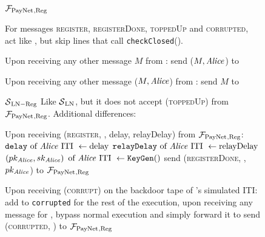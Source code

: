 \begin{figure}[!htbp]
  \begin{systembox}{$\mathcal{F}_{\mathrm{PayNet}}{}_{\mathrm{, Reg}}$}
    \begin{algorithmic}[1]
      \State For messages \textsc{register}, \textsc{registerDone},
      \textsc{toppedUp} and \textsc{corrupted}, act like \fpaynet{}, but skip
      lines that call \texttt{checkClosed}().
      \Statex

      \State Upon receiving any other message $M$ from \alice:
      \Indent
          \State send ($M, \mathit{Alice}$) to \simulator
        \EndIf
      \EndIndent
      \Statex

      \State Upon receiving any other message ($M, \mathit{Alice}$) from \simulator:
      \Indent
          \State send $M$ to \alice
        \EndIf
      \EndIndent
    \end{algorithmic}
  \end{systembox}
  \caption{}
  \label{alg:proof:fpaynet:reg}
\end{figure}

\begin{figure}[!htbp]
  \begin{simulatorbox}{$\mathcal{S}{}_{\mathrm{LN - Reg}}$}
    Like $\mathcal{S}{}_{\mathrm{LN}}$, but it does not accept
    (\textsc{toppedUp}) from $\mathcal{F}_{\mathrm{PayNet}}{}_{\mathrm{, Reg}}$.
    Additional differences:
    \begin{algorithmic}[1]
      \State Upon receiving (\textsc{register}, \alice, delay, relayDelay) from
      $\mathcal{F}_{\mathrm{PayNet}}{}_{\mathrm{, Reg}}$:
      \Indent
        \State $\mathtt{delay} \text{ of \ensuremath{\mathit{Alice}}{} ITI } \gets \mathrm{delay}$
        \label{alg:sim:reg:delay}
        \State $\mathtt{relayDelay} \text{ of \ensuremath{\mathit{Alice}}{} ITI } \gets
        \mathrm{relayDelay}$
        \State $\left(pk_{\mathit{Alice}}, sk_{\mathit{Alice}}\right) \text{ of \ensuremath{\mathit{Alice}}{} ITI }
        \gets \mathtt{KeyGen}()$
        \label{alg:sim:reg:keygen}
        \State send (\textsc{registerDone}, \alice, $pk_{\mathit{Alice}}$) to
        $\mathcal{F}_{\mathrm{PayNet}}{}_{\mathrm{, Reg}}$
      \EndIndent
      \Statex

      \State Upon receiving (\textsc{corrupt}) on the backdoor tape of \alice's
      simulated ITI:
      \Indent
        \State add \alice{} to \texttt{corrupted}
        \State for the rest of the execution, upon receiving any message for
        \alice{}, bypass normal execution and simply forward it to
        \alice
        \State send (\textsc{corrupted}, \alice) to $\mathcal{F}_{\mathrm{PayNet}}{}_{\mathrm{,
        Reg}}$
      \EndIndent
    \end{algorithmic}
  \end{simulatorbox}
  \caption{}
  \label{alg:sim:reg}
\end{figure}

